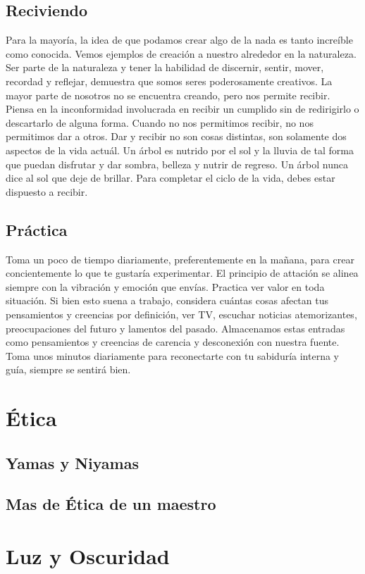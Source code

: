 \begin{itemize}
\subsection{Reciviendo}
Para la mayoría, la idea de que podamos crear algo de la nada es tanto increíble como conocida. Vemos ejemplos de creación a nuestro alrededor en la naturaleza. Ser parte de la naturaleza y tener la habilidad de discernir, sentir, mover, recordad y reflejar, demuestra que somos seres poderosamente creativos. La mayor parte de nosotros no se encuentra creando, pero nos permite recibir. Piensa en la inconformidad involucrada en recibir un cumplido sin de redirigirlo o descartarlo de alguna forma. Cuando no nos permitimos recibir, no nos permitimos dar a otros. Dar y recibir no son cosas distintas, son solamente dos aspectos de la vida actuál. Un árbol es nutrido por el sol y la lluvia de tal forma que puedan disfrutar y dar sombra, belleza y nutrir de regreso. Un árbol nunca dice al sol que deje de brillar. Para completar el ciclo de la vida, debes estar dispuesto a recibir.

\subsection{Práctica}
Toma un poco de tiempo diariamente, preferentemente en la mañana, para crear concientemente lo que te gustaría experimentar. El principio de attación se alinea siempre con la vibración y emoción que envías. Practica ver valor en toda situación. Si bien esto suena a trabajo, considera cuántas cosas afectan tus pensamientos y creencias por definición, ver TV, escuchar noticias atemorizantes, preocupaciones del futuro y lamentos del pasado. Almacenamos estas entradas como pensamientos y creencias de carencia y desconexión con nuestra fuente. Toma unos minutos diariamente para reconectarte con tu sabiduría interna y guía, siempre se sentirá bien.

\section{Ética}
\subsection{Yamas y Niyamas}
\subsection{Mas de Ética de un maestro}
\section{Luz y Oscuridad}

\end{itemize}
